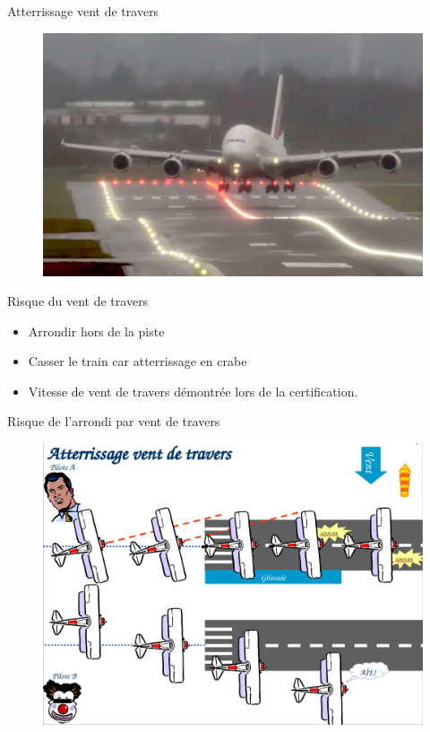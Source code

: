 \documentclass{beamer}
\begin{document}
\begin{frame}{Atterrissage vent de travers}
  \begin{figure}
    \centering
    \includegraphics[scale=0.3]{images/A380-atterrissage-travers-CE.jpg}
  \end{figure}
\end{frame}


\begin{frame}{Risque du vent de travers}
  \begin{itemize}
    \item Arrondir hors de la piste \pause
    \item Casser le train car atterrissage en crabe \pause
    \item Vitesse de vent de travers démontrée lors de la certification.
  \end{itemize}
\end{frame}

\begin{frame}{Risque de l'arrondi par vent de travers}
  \begin{figure}
    \centering
    \includegraphics[scale=0.9]{images/vent-travers.png}
  \end{figure}
\end{frame}
\end{document}
